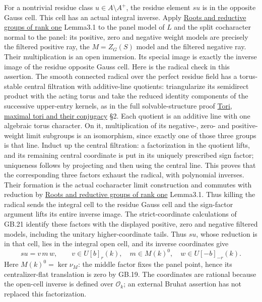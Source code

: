 \documentclass[
  11pt,
]{article}
\begin{document}
For a nontrivial residue class \(u\in A\setminus A^+\), the residue
element \(su\) is in the opposite Gauss cell. This cell has an actual
integral inverse. Apply \href{../AG-RG/AG-RG-03.html}{Roots and
reductive groups of rank one} Lemma3.1 to the panel model of \(L\) and
the split cocharacter normal to the panel: its positive, zero and
negative weight models are precisely the filtered positive ray, the
\(M=Z_G(S)\) model and the filtered negative ray. Their multiplication
is an open immersion. Its special image is exactly the inverse image of
the residue opposite Gauss cell. Here is the radical check in this
assertion. The smooth connected radical over the perfect residue field
has a torus-stable central filtration with additive-line quotients:
triangularize its semidirect product with the acting torus and take the
reduced identity components of the successive upper-entry kernels, as in
the full solvable-structure proof \href{../AG-RG/AG-RG-01.html}{Tori,
maximal tori and their conjugacy} §2. Each quotient is an additive line
with one algebraic torus character. On it, multiplication of its
negative-, zero- and positive-weight limit subgroups is an isomorphism,
since exactly one of those three groups is that line. Induct up the
central filtration: a factorization in the quotient lifts, and its
remaining central coordinate is put in its uniquely prescribed sign
factor; uniqueness follows by projecting and then using the central
line. This proves that the corresponding three factors exhaust the
radical, with polynomial inverses. Their formation is the actual
cocharacter limit construction and commutes with reduction by
\href{../AG-RG/AG-RG-03.html}{Roots and reductive groups of rank one}
Lemma3.1. Thus killing the radical sends the integral cell to the
residue Gauss cell and the sign-factor argument lifts its entire inverse
image. The strict-coordinate calculations of GB.21 identify these
factors with the displayed positive, zero and negative filtered models,
including the unitary higher-coordinate tails. Thus \(su\), whose
reduction is in that cell, lies in the integral open cell, and its
inverse coordinates give \[
                 su=v\,m\,w,\qquad
 v\in U[b]_r(k),\quad m\in M(k)^0,\quad
                            w\in U[-b]_{-r}(k).             \tag{GB22.2}
\] Here \(M(k)^0=\ker\nu_M\): the middle factor fixes the panel point,
hence its centralizer-flat translation is zero by GB.19. The coordinates
are rational because the open-cell inverse is defined over
\(\mathcal O_k\); an external Bruhat assertion has not replaced this
factorization.
\end{document}
